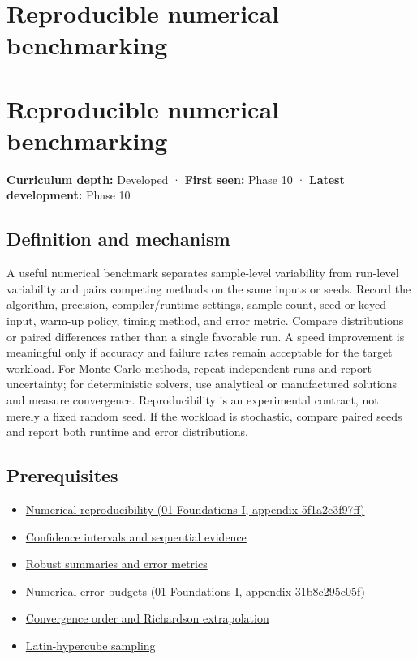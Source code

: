 \hypertarget{appendix-b9db93e28371}{}
\section*{Reproducible numerical benchmarking}
\section{Reproducible numerical benchmarking}\label{reproducible-numerical-benchmarking}

\textbf{Curriculum depth:} Developed · \textbf{First seen:} Phase 10 · \textbf{Latest development:} Phase 10

\subsection{Definition and mechanism}\label{definition-and-mechanism}

A useful numerical benchmark separates sample-level variability from run-level variability and pairs competing methods on the same inputs or seeds. Record the algorithm, precision, compiler/runtime settings, sample count, seed or keyed input, warm-up policy, timing method, and error metric. Compare distributions or paired differences rather than a single favorable run. A speed improvement is meaningful only if accuracy and failure rates remain acceptable for the target workload. For Monte Carlo methods, repeat independent runs and report uncertainty; for deterministic solvers, use analytical or manufactured solutions and measure convergence. Reproducibility is an experimental contract, not merely a fixed random seed. If the workload is stochastic, compare paired seeds and report both runtime and error distributions.

\subsection{Prerequisites}\label{prerequisites}

\begin{itemize}
\tightlist
\item
  \href{}{Numerical reproducibility (01-Foundations-I, appendix-5f1a2c3f97ff)}
\item
  \hyperref[appendix-c83016554b1e]{Confidence intervals and sequential evidence}
\item
  \hyperref[appendix-bcc44e9d3d02]{Robust summaries and error metrics}
\item
  \href{}{Numerical error budgets (01-Foundations-I, appendix-31b8c295e05f)}
\item
  \hyperref[appendix-aca80b6bf17a]{Convergence order and Richardson extrapolation}
\item
  \hyperref[appendix-1c5e85693a06]{Latin-hypercube sampling}
\end{itemize}

